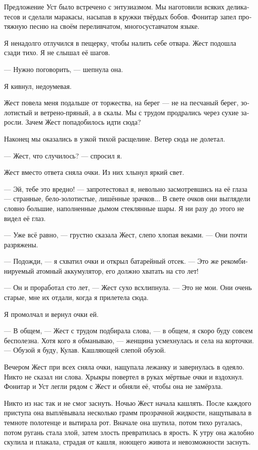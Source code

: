 \documentclass[a4paper,12pt,fleqn]{book}\usepackage{polyglossia}\setdefaultlanguage[babelshorthands=true]{russian}\setotherlanguage{english}\defaultfontfeatures{Ligatures=TeX,Mapping=tex-text}
\newcommand{\asterism}{\vspace{1em}{\centering\Large\bfseries$\ast~\ast~\ast$\par}\vspace{1em}}
\begin{document}
Предложение Уст было встречено с энтузиазмом.
Мы наготовили всяких деликатесов и сделали маракасы, насыпав в кружки твёрдых бобов.
Фонитар запел протяжную песню на своём переливчатом, многосуставчатом языке.


Я ненадолго отлучился в пещерку, чтобы налить себе отвара.
Жест подошла сзади тихо.
Я не слышал её шагов.

--- Нужно поговорить, --- шепнула она.

Я кивнул, недоумевая.

Жест повела меня подальше от торжества, на берег --- не на песчаный берег, золотистый и ветрено-пряный, а в скалы.
Мы с трудом продрались через сухие заросли.
Зачем Жест попадобилось идти сюда?

Наконец мы оказались в узкой тихой расщелине.
Ветер сюда не долетал.

--- Жест, что случилось? --- спросил я.

Жест вместо ответа сняла очки.
Из них хлынул яркий свет.

--- Эй, тебе это вредно! --- запротестовал я, невольно засмотревшись на её глаза --- странные, бело-золотистые, лишённые зрачков...
В свете очков они выглядели словно большие, наполненные дымом стеклянные шары.
Я ни разу до этого не видел её глаз.

--- Уже всё равно, --- грустно сказала Жест, слепо хлопая веками.
--- Они почти разряжены.

--- Подожди, --- я схватил очки и открыл батарейный отсек.
--- Это же рекомбинируемый атомный аккумулятор, его должно хватать на сто лет!

--- Он и проработал сто лет, --- Жест сухо всхлипнула.
--- Это не мои.
Они очень старые, мне их отдали, когда я прилетела сюда.

Я промолчал и вернул очки ей.

--- В общем, --- Жест с трудом подбирала слова, --- в общем, я скоро буду совсем бесполезна.
Хотя кого я обманываю, --- женщина усмехнулась и села на корточки.
--- Обузой я буду, Кулав.
Кашляющей слепой обузой.

\asterism

Вечером Жест при всех сняла очки, нащупала лежанку и завернулась в одеяло.
Никто не сказал ни слова.
Хрыкры повертел в руках мёртвые очки и вздохнул.
Фонитар и Уст легли рядом с Жест и обняли её, чтобы она не замёрзла.

Никто из нас так и не смог заснуть.
Ночью Жест начала кашлять.
После каждого приступа она выплёвывала несколько грамм прозрачной жидкости, нащупывала в темноте полотенце и вытирала рот.
Вначале она шутила, потом тихо ругалась, потом ругань стала злой, затем злость превратилась в ярость.
К утру она жалобно скулила и плакала, страдая от кашля, ноющего живота и невозможности заснуть.
\end{document}

